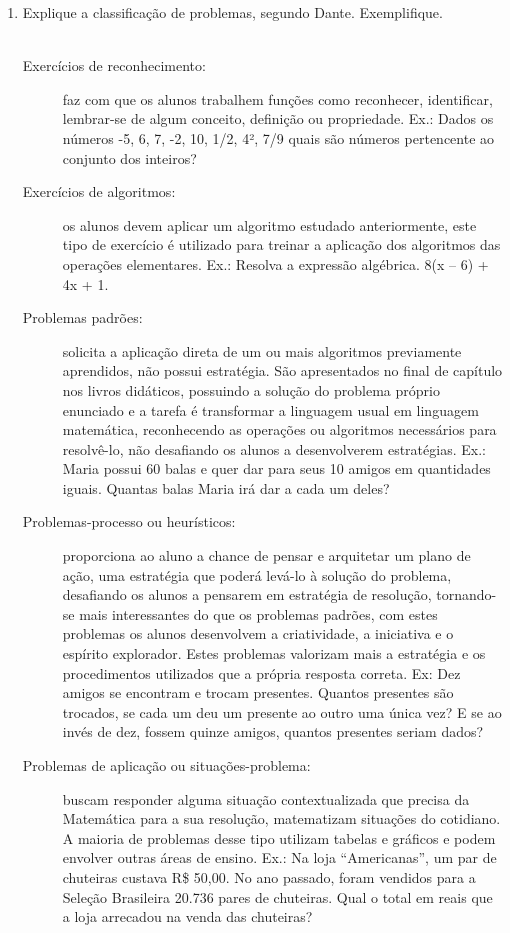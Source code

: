 \documentclass[a4paper, 12pt]{article}
\begin{document}
\begin{enumerate}
\item Explique a classificação de problemas, segundo Dante. Exemplifique. \\ \\
  \begin{description}
    \item[Exercícios de reconhecimento:]        faz com que os alunos trabalhem funções como reconhecer, identificar, lembrar-se de algum conceito, definição ou propriedade. 
Ex.: Dados os números -5, 6, 7, -2, 10, 1/2, 4², 7/9 quais são números pertencente ao conjunto dos inteiros? 
    \item[Exercícios de algoritmos:]  os alunos devem aplicar um algoritmo estudado anteriormente, este tipo de exercício é utilizado para treinar a aplicação dos algoritmos das operações elementares. 
Ex.: Resolva a expressão algébrica. 8(x – 6) + 4x + 1. 
    \item[Problemas padrões:]  solicita a aplicação direta de um ou mais algoritmos previamente aprendidos, não possui estratégia. São apresentados no final de capítulo nos livros didáticos, possuindo a solução do problema próprio enunciado e a tarefa é transformar a linguagem usual em linguagem matemática, reconhecendo as operações ou algoritmos necessários para resolvê-lo, não desafiando os alunos a desenvolverem estratégias. 
Ex.: Maria possui 60 balas e quer dar para seus 10 amigos em quantidades iguais. Quantas balas Maria irá dar a cada um deles? 
    \item[Problemas-processo ou heurísticos:]  proporciona ao aluno a chance de pensar e arquitetar um plano de ação, uma estratégia que poderá levá-lo à solução do problema, desafiando os alunos a pensarem em estratégia de resolução, tornando-se mais interessantes do que os problemas padrões, com estes problemas os alunos desenvolvem a criatividade, a iniciativa e o espírito explorador. Estes problemas valorizam mais a estratégia e os procedimentos utilizados que a própria resposta correta.
Ex: Dez amigos se encontram e trocam presentes. Quantos presentes são trocados, se cada um deu um presente ao outro uma única vez? E se ao invés de dez, fossem quinze amigos, quantos presentes seriam dados? 
    \item[Problemas de aplicação ou situações-problema:]  buscam responder alguma situação contextualizada que precisa da Matemática para a sua resolução, matematizam situações do cotidiano. A maioria de problemas desse tipo utilizam tabelas e gráficos e podem envolver outras áreas de ensino.
Ex.: Na loja “Americanas”, um par de chuteiras custava R\$ 50,00. No ano passado, foram vendidos para a Seleção Brasileira 20.736 pares de chuteiras. Qual o total em reais que a loja arrecadou na venda das chuteiras?

\end{description}
\end{enumerate}
\end{document}
